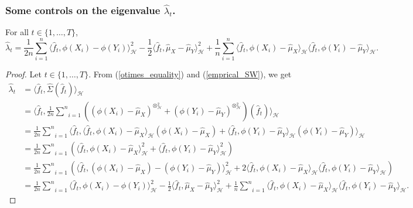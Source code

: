 \documentclass[twoside,11pt]{article}
\newcommand{\Hk}{\mathcal{H}}
\newcommand{\nb}{n}
\begin{document}
\subsubsection*{Some controls on the eigenvalue $\widehat{\lambda}_t$.}
\begin{lemma}
\label{lambda_t_chap_decompo}
For all $t \in \{1,\ldots,T\}$,
\begin{equation*}
   \widehat{\lambda}_t = \frac{1}{2\nb} \underset{i=1}{\overset{\nb}{\sum}} \langle \widehat{f}_t, \phi(X_i) - \phi(Y_i)\rangle_{\Hk}^2 -\frac{1}{2} \langle \widehat{f}_t, \widehat{\mu}_X - \widehat{\mu}_Y \rangle_{\Hk}^2 + \frac{1}{\nb} \underset{i=1}{\overset{\nb}{\sum}} \langle \widehat{f}_t, \phi(X_i) - \widehat{\mu}_X  \rangle_{\Hk} \langle \widehat{f}_t,\phi(Y_i) - \widehat{\mu}_Y  \rangle_{\Hk}.
\end{equation*}
\end{lemma}
\begin{proof}
Let $t \in \{1,\ldots,T\}$. From (\ref{otimes_equality}) and (\ref{emprical_SW}), we get 
\begin{align*}
    \widehat{\lambda}_t 
    &= \langle \widehat{f}_t, \widehat{\Sigma} (\widehat{f}_t) \rangle_{\Hk}  \\
    & = \langle \widehat{f}_t, \frac{1}{2\nb} \underset{i=1}{\overset{\nb}{\sum}} \left( \left( \phi(X_i) - \widehat{\mu}_X \right)^{\otimes_{\Hk}^2} + \left( \phi(Y_i) - \widehat{\mu}_Y \right)^{\otimes_{\Hk}^2} \right) \left(\widehat{f}_t \right) \rangle_{\Hk}  \\
    & = \frac{1}{2\nb} \underset{i=1}{\overset{\nb}{\sum}} \langle \widehat{f}_t, \langle \widehat{f}_t, \phi(X_i) - \widehat{\mu}_X \rangle_{\Hk} \left( \phi(X_i) - \widehat{\mu}_X \right) +  \langle \widehat{f}_t, \phi(Y_i) - \widehat{\mu}_Y \rangle_{\Hk} \left( \phi(Y_i) - \widehat{\mu}_Y \right) \rangle_{\Hk}  \\
    & = \frac{1}{2\nb} \underset{i=1}{\overset{\nb}{\sum}} \left(\langle \widehat{f}_t, \phi(X_i) - \widehat{\mu}_X \rangle_{\Hk}^2 +  \langle \widehat{f}_t, \phi(Y_i) - \widehat{\mu}_Y \rangle_{\Hk}^2 \right)  \\
    & = \frac{1}{2\nb} \underset{i=1}{\overset{\nb}{\sum}} \left( \langle \widehat{f}_t, \left(\phi(X_i) - \widehat{\mu}_X \right) - \left(\phi(Y_i) - \widehat{\mu}_Y \right) \rangle_{\Hk}^2 +  2 \langle \widehat{f}_t, \phi(X_i) - \widehat{\mu}_X  \rangle_{\Hk} \langle \widehat{f}_t,\phi(Y_i) - \widehat{\mu}_Y  \rangle_{\Hk} \right)  \\
    &= \frac{1}{2\nb} \underset{i=1}{\overset{\nb}{\sum}} \langle \widehat{f}_t, \phi(X_i) - \phi(Y_i)\rangle_{\Hk}^2 -\frac{1}{2} \langle \widehat{f}_t, \widehat{\mu}_X - \widehat{\mu}_Y \rangle_{\Hk}^2 + \frac{1}{\nb} \underset{i=1}{\overset{\nb}{\sum}} \langle \widehat{f}_t, \phi(X_i) - \widehat{\mu}_X  \rangle_{\Hk} \langle \widehat{f}_t,\phi(Y_i) - \widehat{\mu}_Y  \rangle_{\Hk}.
\end{align*}
\end{proof}
\end{document}
